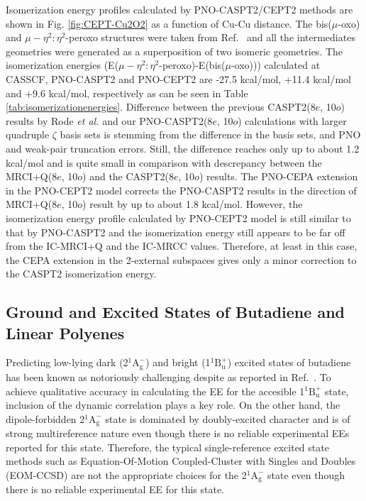\documentclass[aip,jcp,amsmath]{revtex4-1}
\begin{document}
%
Isomerization energy profiles calculated by PNO-CASPT2/CEPT2 methods are shown in Fig. \ref{fig:CEPT-Cu2O2} as a function of Cu-Cu distance.
%
The bis($\mu$-oxo) and $\mu-\eta^2:\eta^2$-peroxo structures were taken from Ref.~ and all the intermediates geometries were generated as a superposition of two isomeric geometries.
%
The isomerization energies (E($\mu-\eta^2:\eta^2$-peroxo)-E(bis($\mu$-oxo))) calculated at CASSCF, PNO-CASPT2 and PNO-CEPT2 are -27.5 kcal/mol, +11.4 kcal/mol and +9.6 kcal/mol, respectively as can be seen in Table \ref{tab:isomerizationenergies}.
%
Difference between the previous CASPT2(8$e$, 10$o$) results by Rode {\it et al.} and our PNO-CASPT2(8$e$, 10$o$) calculations with larger quadruple $\zeta$ basis sets is stemming from the difference in the basis sets, and PNO and weak-pair truncation errors. 
%
Still, the difference reaches only up to about 1.2 kcal/mol and is quite small in comparison with descrepancy between the MRCI+Q(8$e$, 10$o$) and the CASPT2(8$e$, 10$o$) results.
%
The PNO-CEPA extension in the PNO-CEPT2 model corrects the PNO-CASPT2 results in the direction of MRCI+Q(8$e$, 10$o$) result by up to about 1.8 kcal/mol.
%
However, the isomerization energy profile calculated by PNO-CEPT2 model is still similar to that by PNO-CASPT2 and the isomerization energy still appears to be far off from the IC-MRCI+Q and the IC-MRCC values.
%
Therefore, at least in this case, the CEPA extension in the 2-external subspaces gives only a minor correction to the CASPT2 isomerization energy. 

\subsection{Ground and Excited States of Butadiene and Linear Polyenes}

%
Predicting low-lying dark (2${}^1\text{A}_\text{g}^{-}$) and bright (1${}^1\text{B}_\text{u}^{+}$) excited states of butadiene has been known as notoriously challenging despite as reported in Ref.~.
%
To achieve qualitative accuracy in calculating the EE for the accesible 1${}^1\text{B}_\text{u}^{+}$ state, inclusion of the dynamic correlation plays a key role.
%
On the other hand, the dipole-forbidden 2${}^1\text{A}_\text{g}^{-}$ state is dominated by doubly-excited character and is of strong multireference nature even though there is no reliable experimental EEs reported for this state.
%
Therefore, the typical single-reference excited state methods such as Equation-Of-Motion Coupled-Cluster with Singles and Doubles (EOM-CCSD) are not the appropriate choices for the 2${}^1\text{A}_\text{g}^{-}$ state even though there is no reliable experimental EE for this state.
\end{document}
